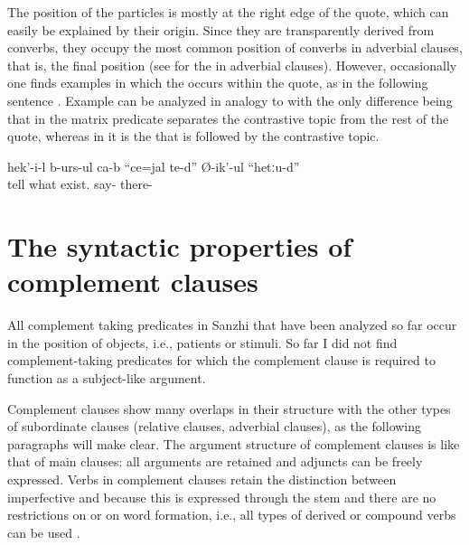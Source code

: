 The position of the  particles is mostly at the right edge of the quote, which can easily be explained by their origin. Since they are transparently derived from converbs, they occupy the most common position of converbs in adverbial clauses, that is, the final position (see  for the  in adverbial clauses). However, occasionally one finds examples in which the   occurs within the quote, as in the following sentence . Example  can be analyzed in analogy to  with the only difference being that in  the matrix predicate separates the contrastive topic from the rest of the quote, whereas in  it is the   that is followed by the contrastive topic.
%
\begin{exe}
	\ex	\label{ex:He is telling that there is something there}
	\gll	hek'-i-l	b-urs-ul	ca-b	``ce=jal	te-d''	Ø-ik'-ul	``hetːu-d''\\
			tell		what	exist.		say-	there-\\
	\glt	{}
\end{exe}



\section{The syntactic properties of complement clauses}
\label{sec:The syntactic properties of complement clauses}

All complement taking predicates in Sanzhi that have been analyzed so far occur in the position of objects, i.e., patients or stimuli. So far I did not find complement-taking predicates for which the complement clause is required to function as a subject-like argument.

Complement clauses show many overlaps in their structure with the other types of subordinate clauses (relative clauses, adverbial clauses), as the following paragraphs will make clear.
The argument structure of complement clauses is like that of main clauses: all arguments are retained and adjuncts can be freely expressed. Verbs in complement clauses retain the distinction between imperfective and  because this is expressed through the stem and there are no restrictions on  or on word formation, i.e., all types of derived or compound verbs can be used .

